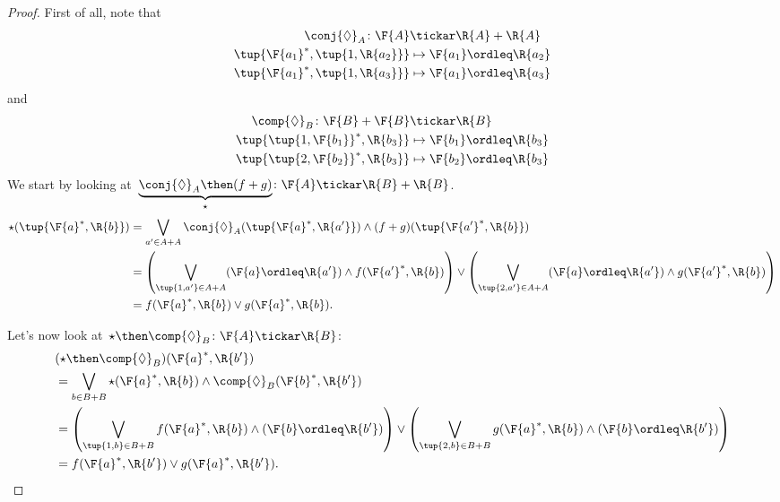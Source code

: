 \begin{proof}
First of all, note that
\begin{equation}
    \begin{aligned}
    \conj{\Diamond}_A\colon \F{A}&\tickar \R{A}+\R{A}\\
    \tup{\F{a_1}^*,\tup{1,\R{a_2}}}&\mapsto \F{a_1}\ordleq \R{a_2}\\
    \tup{\F{a_1}^*,\tup{1,\R{a_3}}}&\mapsto \F{a_1}\ordleq \R{a_3}
    \end{aligned}
\end{equation}
and
\begin{equation}
    \begin{aligned}
    \comp{\Diamond}_B\colon \F{B}+\F{B}&\tickar \R{B}\\
    \tup{\tup{1,\F{b_1}}^*,\R{b_3}}&\mapsto \F{b_1}\ordleq \R{b_3}\\
    \tup{\tup{2,\F{b_2}}^*,\R{b_3}}&\mapsto \F{b_2}\ordleq \R{b_3}
    \end{aligned}
\end{equation}
We start by looking at~$\underbrace{\conj{\Diamond}_A\then (f+g)}_{\star}\colon \F{A} \tickar \R{B}+\R{B}$.
\begin{equation}
    \begin{aligned}
    \star (\tup{\F{a}^*,\R{b}})&=\bigvee_{a'\in A+A} \conj{\Diamond}_A(\tup{\F{a}^*,\R{a'}})\wedge (f+g)(\tup{\F{a'}^*,\R{b}})\\
    &=\left( \bigvee_{\tup{1,a'}\in A+A} (\F{a}\ordleq \R{a'})\wedge f(\F{a'}^*,\R{b}) \right)\vee \left( \bigvee_{\tup{2,a'}\in A+A} (\F{a}\ordleq \R{a'})\wedge g(\F{a'}^*,\R{b}) \right)\\
    &=f(\F{a}^*,\R{b}) \vee g(\F{a}^*,\R{b}).
    \end{aligned}
\end{equation}

Let's now look at~$\star \then \comp{\Diamond}_B\colon \F{A} \tickar \R{B}$:
\begin{equation}
    \begin{aligned}
    &(\star \then \comp{\Diamond}_B)(\F{a}^*,\R{b'})\\
    &=\bigvee_{b\in B+B} \star(\F{a}^*,\R{b})\wedge \comp{\Diamond}_B(\F{b}^*,\R{b'}) \\
    &=\left(\bigvee_{\tup{1,b}\in B+B} f(\F{a}^*,\R{b}) \wedge (\F{b}\ordleq \R{b'})\right) \vee
    \left(\bigvee_{\tup{2,b}\in B+B} g(\F{a}^*,\R{b}) \wedge (\F{b}\ordleq \R{b'})\right)\\
    &=f(\F{a}^*,\R{b'})\vee g(\F{a}^*,\R{b'}).
    \end{aligned}
\end{equation}
\end{proof}

